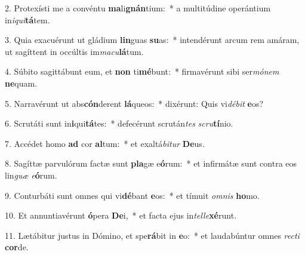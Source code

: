 2. Protexísti me a convéntu \textbf{ma}li\textbf{gnán}tium:~*  a multitúdine operántium in\textit{i}\textit{qui}\textbf{tá}tem.\

3. Quia exacuérunt ut gládium \textbf{lin}guas \textbf{su}as:~*  intendérunt arcum rem amáram, ut sagíttent in occúltis im\textit{ma}\textit{cu}\textbf{lá}tum.\

4. Súbito sagittábunt eum, et \textbf{non} ti\textbf{mé}bunt:~*  firmavérunt sibi ser\textit{mó}\textit{nem} \textbf{ne}quam.\

5. Narravérunt ut abs\textbf{cón}derent \textbf{lá}queos:~*  dixérunt: Quis vi\textit{dé}\textit{bit} \textbf{e}os?\

6. Scrutáti sunt in\textbf{i}qui\textbf{tá}tes:~*  defecérunt scrután\textit{tes} \textit{scru}\textbf{tí}nio.\

7. Accédet homo \textbf{ad} cor \textbf{al}tum:~*  et exaltá\textit{bi}\textit{tur} \textbf{De}us.\

8. Sagíttæ parvulórum factæ sunt \textbf{pla}gæ e\textbf{ó}rum:~*  et infirmátæ sunt contra eos lin\textit{guæ} \textit{e}\textbf{ó}rum.\

9. Conturbáti sunt omnes qui vi\textbf{dé}bant \textbf{e}os:~*  et tímuit \textit{om}\textit{nis} \textbf{ho}mo.\

10. Et annuntiavérunt \textbf{ó}pera \textbf{De}i,~*  et facta ejus in\textit{tel}\textit{le}\textbf{xé}runt.\

11. Lætábitur justus in Dómino, et spe\textbf{rá}bit in \textbf{e}o:~*  et laudabúntur omnes \textit{rec}\textit{ti} \textbf{cor}de.\

